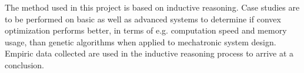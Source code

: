 The method used in this project is based on inductive reasoning. Case studies are to be performed on basic as well as advanced systems to determine if convex optimization performs better, in terms of e.g. computation speed and memory usage, than genetic algorithms when applied to mechatronic system design. Empiric data collected are used in the inductive reasoning process to arrive at a conclusion.
